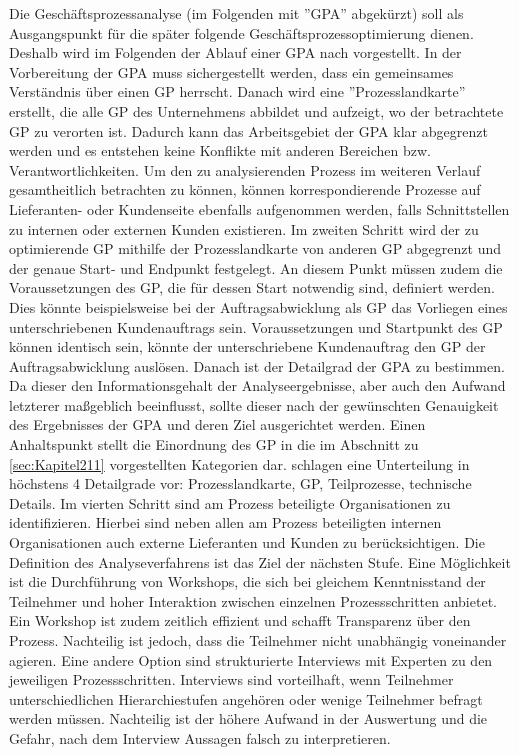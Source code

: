 Die Geschäftsprozessanalyse (im Folgenden mit ''GPA'' abgekürzt) soll als Ausgangspunkt für die später folgende Geschäftsprozessoptimierung dienen. Deshalb wird im Folgenden der Ablauf einer GPA nach \cite[][S. 63ff]{theorie_best_geschaftsprozesse_optimieren_2009} vorgestellt.
In der Vorbereitung der GPA muss sichergestellt werden, dass ein gemeinsames Verständnis über einen GP herrscht. Danach wird eine ''Prozesslandkarte'' erstellt, die alle GP des Unternehmens abbildet und aufzeigt, wo der betrachtete GP zu verorten ist. Dadurch kann das Arbeitsgebiet der GPA klar abgegrenzt werden und es entstehen keine Konflikte mit anderen Bereichen bzw. Verantwortlichkeiten. Um den zu analysierenden Prozess im weiteren Verlauf gesamtheitlich betrachten zu können, können korrespondierende Prozesse auf Lieferanten- oder Kundenseite ebenfalls aufgenommen werden, falls Schnittstellen zu internen oder externen Kunden existieren. 
Im zweiten Schritt wird der zu optimierende GP mithilfe der Prozesslandkarte von anderen GP abgegrenzt und der genaue Start- und Endpunkt festgelegt. An diesem Punkt müssen zudem die Voraussetzungen des GP, die für dessen Start notwendig sind, definiert werden. Dies könnte beispielsweise bei der Auftragsabwicklung als GP das Vorliegen eines unterschriebenen Kundenauftrags sein. Voraussetzungen und Startpunkt des GP können identisch sein, \zB könnte der unterschriebene Kundenauftrag den GP der Auftragsabwicklung auslösen. 
Danach ist der Detailgrad der GPA zu bestimmen. Da dieser den Informationsgehalt der Analyseergebnisse, aber auch den Aufwand letzterer ma\ss geblich beeinflusst, sollte dieser nach der gewünschten Genauigkeit des Ergebnisses der GPA und deren Ziel ausgerichtet werden. Einen Anhaltspunkt stellt die Einordnung des GP in die im Abschnitt zu \ref{sec:Kapitel211} vorgestellten Kategorien dar. \cite{theorie_best_geschaftsprozesse_optimieren_2009} schlagen eine Unterteilung in höchstens 4 Detailgrade vor: Prozesslandkarte, GP, Teilprozesse, technische Details.
Im vierten Schritt sind am Prozess beteiligte Organisationen zu identifizieren. Hierbei sind neben allen am Prozess beteiligten internen Organisationen auch externe Lieferanten und Kunden zu berücksichtigen.
Die Definition des Analyseverfahrens ist das Ziel der nächsten Stufe. Eine Möglichkeit ist die Durchführung von Workshops, die sich bei gleichem Kenntnisstand der Teilnehmer und hoher Interaktion zwischen einzelnen Prozessschritten anbietet. Ein Workshop ist zudem zeitlich effizient und schafft Transparenz über den Prozess. Nachteilig ist jedoch, dass die Teilnehmer nicht unabhängig voneinander agieren. Eine andere Option sind strukturierte Interviews mit Experten zu den jeweiligen Prozessschritten. Interviews sind vorteilhaft, wenn Teilnehmer unterschiedlichen Hierarchiestufen angehören oder wenige Teilnehmer befragt werden müssen. Nachteilig ist der höhere Aufwand in der Auswertung und die Gefahr, nach dem Interview Aussagen falsch zu interpretieren.
